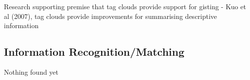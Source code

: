 Research supporting premise that tag clouds provide support for gisting
- Kuo et al (2007), tag clouds provide improvements for summarising descriptive information

\subsection{Information Recognition/Matching}

Nothing found yet


